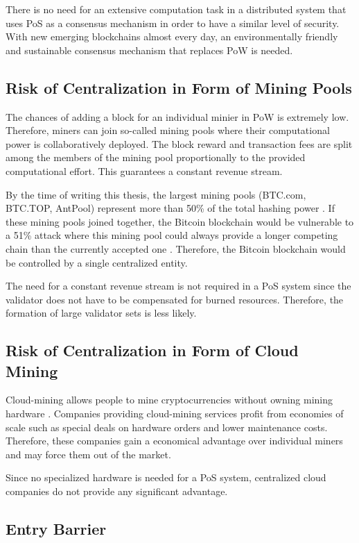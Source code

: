 There is no need for an extensive computation task in a distributed system that uses PoS as a consensus mechanism in order to have a similar level of security. With new emerging blockchains almost every day, an environmentally friendly and sustainable consensus mechanism that replaces PoW is needed. 

\subsection{Risk of Centralization in Form of Mining Pools}
The chances of adding a block for an individual minier in PoW is extremely low. Therefore, miners can join so-called mining pools where their computational power is collaboratively deployed. The block reward and transaction fees are split among the members of the mining pool proportionally to the provided computational effort. This guarantees a constant revenue stream. 

By the time of writing this thesis, the largest mining pools (BTC.com, BTC.TOP, AntPool) represent more than 50\% of the total hashing power \cite{bitcoin_mining_pools_2}. If these mining pools joined together, the Bitcoin blockchain would be vulnerable to a 51\% attack where this mining pool could always provide a longer competing chain than the currently accepted one \cite{51_attack}. Therefore, the Bitcoin blockchain would be controlled by a single centralized entity. 

The need for a constant revenue stream is not required in a PoS system since the validator does not have to be compensated for burned resources. Therefore, the formation of large validator sets is less likely.

\subsection{Risk of Centralization in Form of Cloud Mining}
Cloud-mining allows people to mine cryptocurrencies without owning mining hardware \cite{bitcoin_cloud_mining}. Companies providing cloud-mining services profit from economies of scale such as special deals on hardware orders and lower maintenance costs. Therefore, these companies gain a economical advantage over individual miners and may force them out of the market.

Since no specialized hardware is needed for a PoS system, centralized cloud companies do not provide any significant advantage.

\subsection{Entry Barrier}

